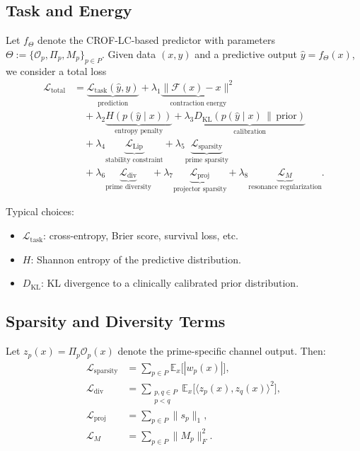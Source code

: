 \documentclass[11pt]{article}
\begin{document}
\subsection{Task and Energy}

Let \(f_\Theta\) denote the CROF-LC-based predictor with parameters
\(\Theta := \{\mathcal{O}_p, \Pi_p, M_p\}_{p \in P}\).
Given data \((x,y)\) and a predictive output \(\hat{y} = f_\Theta(x)\), we consider a total loss
\begin{align*}
  \mathcal{L}_{\text{total}} &=
  \underbrace{\mathcal{L}_{\text{task}}(\hat{y}, y)}_{\text{prediction}}
  + \lambda_1 \underbrace{\|\mathcal{F}(x) - x\|^2}_{\text{contraction energy}} \\
  &\quad + \lambda_2 \underbrace{H(p(\hat{y}\mid x))}_{\text{entropy penalty}}
  + \lambda_3 \underbrace{D_{\mathrm{KL}}(p(\hat{y}\mid x)\,\|\,\text{prior})}_{\text{calibration}} \\
  &\quad + \lambda_4 \underbrace{\mathcal{L}_{\mathrm{Lip}}}_{\text{stability constraint}}
  + \lambda_5 \underbrace{\mathcal{L}_{\mathrm{sparsity}}}_{\text{prime sparsity}} \\
  &\quad + \lambda_6 \underbrace{\mathcal{L}_{\mathrm{div}}}_{\text{prime diversity}}
  + \lambda_7 \underbrace{\mathcal{L}_{\mathrm{proj}}}_{\text{projector sparsity}}
  + \lambda_8 \underbrace{\mathcal{L}_M}_{\text{resonance regularization}}.
\end{align*}

Typical choices:
\begin{itemize}[leftmargin=*]
  \item \(\mathcal{L}_{\text{task}}\): cross-entropy, Brier score, survival loss, etc.
  \item \(H\): Shannon entropy of the predictive distribution.
  \item \(D_{\mathrm{KL}}\): KL divergence to a clinically calibrated prior distribution.
\end{itemize}

\subsection{Sparsity and Diversity Terms}

Let \(z_p(x) = \Pi_p \mathcal{O}_p(x)\) denote the prime-specific channel output.
Then:
\begin{align*}
  \mathcal{L}_{\mathrm{sparsity}} &= \sum_{p \in P} \mathbb{E}_x \big[ |w_p(x)| \big], \\
  \mathcal{L}_{\mathrm{div}} &= \sum_{\substack{p,q \in P \\ p < q}}
    \mathbb{E}_x \big[ \langle z_p(x), z_q(x) \rangle^2 \big], \\
  \mathcal{L}_{\mathrm{proj}} &= \sum_{p \in P} \|s_p\|_1, \\
  \mathcal{L}_M &= \sum_{p \in P} \|M_p\|_F^2.
\end{align*}
\end{document}

